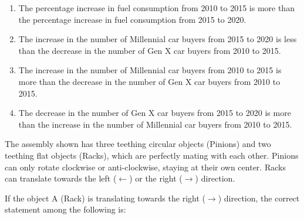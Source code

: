     \begin{enumerate}
        \item The percentage increase in fuel consumption from 2010 to 2015 is more than the percentage increase in fuel consumption from 2015 to 2020.
        \item The increase in the number of Millennial car buyers from 2015 to 2020 is less than the decrease in the number of Gen X car buyers from 2010 to 2015.
        \item The increase in the number of Millennial car buyers from 2010 to 2015 is more than the decrease in the number of Gen X car buyers from 2010 to 2015.
        \item The decrease in the number of Gen X car buyers from 2015 to 2020 is more than the increase in the number of Millennial car buyers from 2010 to 2015.
    \end{enumerate}
    \item The assembly shown has three teething circular objects (Pinions) and two teething flat objects (Racks), which are perfectly mating with each other. Pinions can only rotate clockwise or anti-clockwise, staying at their own center. Racks can translate towards the left ($\leftarrow$) or the right ($\rightarrow$) direction.

    If the object A (Rack) is translating towards the right ($\rightarrow$) direction, the correct statement among the following is:

